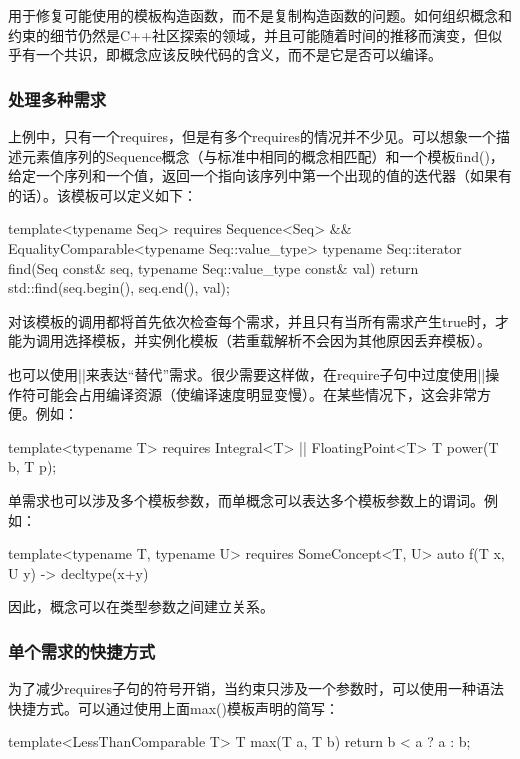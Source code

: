 用于修复可能使用的模板构造函数，而不是复制构造函数的问题。如何组织概念和约束的细节仍然是C++社区探索的领域，并且可能随着时间的推移而演变，但似乎有一个共识，即概念应该反映代码的含义，而不是它是否可以编译。

\subsubsection{处理多种需求}

上例中，只有一个requires，但是有多个requires的情况并不少见。可以想象一个描述元素值序列的Sequence概念（与标准中相同的概念相匹配）和一个模板find()，给定一个序列和一个值，返回一个指向该序列中第一个出现的值的迭代器（如果有的话）。该模板可以定义如下：

\begin{cpp}
template<typename Seq>
	requires Sequence<Seq> &&
			EqualityComparable<typename Seq::value_type>
	typename Seq::iterator find(Seq const& seq,
								typename Seq::value_type const& val) {
	return std::find(seq.begin(), seq.end(), val);
}
\end{cpp}

对该模板的调用都将首先依次检查每个需求，并且只有当所有需求产生true时，才能为调用选择模板，并实例化模板（若重载解析不会因为其他原因丢弃模板）。

也可以使用||来表达“替代”需求。很少需要这样做，在require子句中过度使用||操作符可能会占用编译资源（使编译速度明显变慢）。在某些情况下，这会非常方便。例如：

\begin{cpp}
template<typename T>
	requires Integral<T> ||
			FloatingPoint<T>
T power(T b, T p);
\end{cpp}

单需求也可以涉及多个模板参数，而单概念可以表达多个模板参数上的谓词。例如：

\begin{cpp}
template<typename T, typename U>
	requires SomeConcept<T, U>
auto f(T x, U y) -> decltype(x+y)
\end{cpp}

因此，概念可以在类型参数之间建立关系。

\subsubsection{单个需求的快捷方式}

为了减少requires子句的符号开销，当约束只涉及一个参数时，可以使用一种语法快捷方式。可以通过使用上面max()模板声明的简写：

\begin{cpp}
template<LessThanComparable T>
T max(T a, T b) {
	return b < a ? a : b;
}
\end{cpp}

